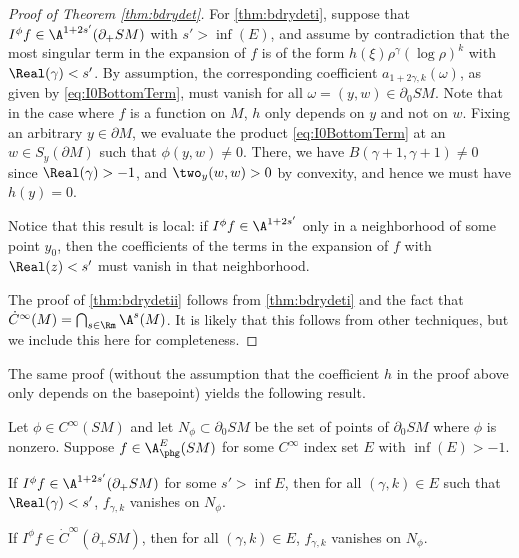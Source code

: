 \begin{proof}[Proof of Theorem \ref{thm:bdrydet}]
For \eqref{thm:bdrydeti}, suppose that $I^\phi f \in \A^{1+2s'} (\partial_+ SM)$ with $s' > \inf(E)$, and assume by contradiction that the most singular term in the expansion of $f$ is of the form $h(\xi) \rho^\gamma (\log \rho)^k$ with $\Real(\gamma) < s'$. By assumption, the corresponding coefficient $a_{1+2\gamma, k}(\omega)$, as given by \eqref{eq:I0BottomTerm}, must vanish for all $\omega = (y,w)\in \partial_0 SM$. Note that in the case where $f$ is a function on $M$, $h$ only depends on $y$ and not on $w$. Fixing an arbitrary $y\in \partial M$, we evaluate the product \eqref{eq:I0BottomTerm} at an $w\in S_y (\partial M)$ such that $\phi(y,w) \ne 0$. There, we have $B(\gamma+1,\gamma+1) \neq 0$ since $\Real(\gamma)>-1$, and $\two_y(w,w) > 0$ by convexity, and hence we must have $h(y) = 0$.

Notice that this result is local: if $I^\phi f \in \A^{1+2s'}$ only in a neighborhood of some point $y_0$, then the coefficients of the terms in the expansion of $f$ with $\Real(z) < s'$ must vanish in that neighborhood.

The proof of \eqref{thm:bdrydetii} follows from \eqref{thm:bdrydeti} and the fact that $\dot{C}^\infty(M) = \bigcap_{s\in \Rm} \A^s(M)$. It is likely that this follows from other techniques, but we include this here for completeness.
\end{proof}

The same proof (without the assumption that the coefficient $h$ in the proof above only depends on the basepoint) yields the following result.

\begin{Theorem}\label{thm:bdrydetSM}
Let $\phi\in C^\infty(SM)$ and let $N_\phi \subset \partial_0 SM$ be the set of points of $\partial_0 SM$ where $\phi$ is nonzero.
Suppose $f\in \A^E_{\phg}(SM)$ for some $C^\infty$ index set $E$ with $\inf(E)>-1$.
\begin{enumeratei}
\item
If $I^\phi f \in \A^{1+2s'} (\partial_+ SM)$ for some $s'>\inf E$, then for all $(\gamma,k)\in E$ such that $\Real(\gamma)<s'$, $f_{\gamma,k}$ vanishes on $N_\phi$.

\item
If $I^\phi f \in \dot{C}^\infty (\partial_+ SM)$, then for all $(\gamma,k)\in E$, $f_{\gamma,k}$ vanishes on $N_\phi$.
\end{enumeratei}
\end{Theorem}

